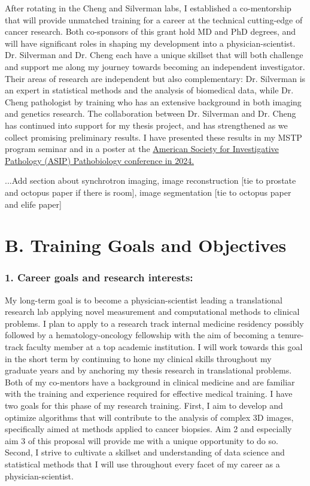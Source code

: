\documentclass{NIHGrant}
\begin{document}
After rotating in the Cheng and Silverman labs, I established a co-mentorship that will provide unmatched training for a career at the technical cutting-edge of cancer research. {Both co-sponsors of this grant hold MD and PhD degrees, and will have significant roles in shaping my development into a physician-scientist.} Dr. Silverman and Dr. Cheng each have a unique skillset that will both challenge and support me along my journey towards becoming an independent investigator. Their areas of research are independent but also complementary: Dr. Silverman is an expert in statistical methods and the analysis of biomedical data, while Dr. Cheng pathologist by training who has an extensive background in both imaging and genetics research. The collaboration between Dr. Silverman and Dr. Cheng has continued into support for my thesis project, and has strengthened as we collect promising preliminary results. I have presented these results in my MSTP program seminar and in a poster at the \uline{American Society for Investigative Pathology (ASIP) Pathobiology conference in 2024.}

...Add section about synchrotron imaging, image reconstruction [tie to prostate and octopus paper if there is room], image segmentation [tie to octopus paper and elife paper]

\section*{B. Training Goals and Objectives}
\subsubsection*{1. Career goals and research interests:}
My long-term goal is to become a physician-scientist leading a translational research lab applying novel measurement and computational methods to clinical problems. I plan to apply to a research track internal medicine residency possibly followed by a hematology-oncology fellowship with the aim of becoming a tenure-track faculty member at a top academic institution. I will work towards this goal in the short term by continuing to hone my clinical skills throughout my graduate years and by anchoring my thesis research in translational problems. Both of my co-mentors have a background in clinical medicine and are familiar with the training and experience required for effective medical training. I have two goals for this phase of my research training. First, I aim to develop and optimize algorithms that will contribute to the analysis of complex 3D images, specifically aimed at methods applied to cancer biopsies. Aim 2 and especially aim 3 of this proposal will provide me with a unique opportunity to do so. Second, I strive to cultivate a  skillset and understanding of data science and statistical methods that I will use throughout every facet of my career as a physician-scientist.
\end{document}
